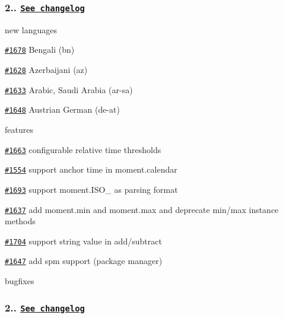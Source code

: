 \subsubsection*{2.. \href{https://gist.github.com/ichernev/b0a3d456d5a84c9901d7}{\tt See changelog}}


\begin{DoxyItemize}
\item new languages
\begin{DoxyItemize}
\item \href{https://github.com/moment/moment/issues/1678}{\tt \#1678} Bengali (bn)
\item \href{https://github.com/moment/moment/issues/1628}{\tt \#1628} Azerbaijani (az)
\item \href{https://github.com/moment/moment/issues/1633}{\tt \#1633} Arabic, Saudi Arabia (ar-\/sa)
\item \href{https://github.com/moment/moment/issues/1648}{\tt \#1648} Austrian German (de-\/at)
\end{DoxyItemize}
\item features
\begin{DoxyItemize}
\item \href{https://github.com/moment/moment/issues/1663}{\tt \#1663} configurable relative time thresholds
\item \href{https://github.com/moment/moment/issues/1554}{\tt \#1554} support anchor time in moment.\+calendar
\item \href{https://github.com/moment/moment/issues/1693}{\tt \#1693} support moment.\+I\+S\+O\+\_ as parsing format
\item \href{https://github.com/moment/moment/issues/1637}{\tt \#1637} add moment.\+min and moment.\+max and deprecate min/max instance methods
\item \href{https://github.com/moment/moment/issues/1704}{\tt \#1704} support string value in add/subtract
\item \href{https://github.com/moment/moment/issues/1647}{\tt \#1647} add spm support (package manager)
\end{DoxyItemize}
\item bugfixes
\end{DoxyItemize}

\subsubsection*{2.. \href{https://gist.github.com/ichernev/10544682}{\tt See changelog}}


